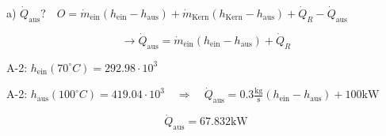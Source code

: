 a) $\dot{Q}_{\text{aus}}? \quad O = \dot{m}_{\text{ein}} (h_{\text{ein}} - h_{\text{aus}}) + \dot{m}_{\text{Kern}} (h_{\text{Kern}} - h_{\text{aus}}) + \dot{Q}_{R} - \dot{Q}_{\text{aus}}$

\[
\rightarrow \dot{Q}_{\text{aus}} = \dot{m}_{\text{ein}} (h_{\text{ein}} - h_{\text{aus}}) + \dot{Q}_{R}
\]

A-2: $h_{\text{ein}} (70^\circ C) = 292.98 \cdot 10^3$

A-2: $h_{\text{aus}} (100^\circ C) = 419.04 \cdot 10^3 \quad \Rightarrow \quad \dot{Q}_{\text{aus}} = 0.3 \frac{\text{kg}}{\text{s}} (h_{\text{ein}} - h_{\text{aus}}) + 100 \text{kW}$

\[
\dot{Q}_{\text{aus}} = 67.832 \text{kW}
\]